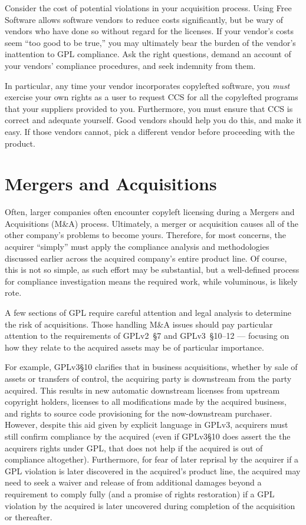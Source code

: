 Consider the cost of potential violations in your acquisition process.
Using Free Software allows software vendors to reduce costs significantly, but be
wary of vendors who have done so without regard for the licenses.  If your
vendor's costs seem ``too good to be true,'' you may ultimately bear the
burden of the vendor's inattention to GPL compliance.  Ask the right
questions, demand an account of your vendors' compliance procedures, and
seek indemnity from them.

In particular, any time your vendor incorporates copylefted software, you
\textit{must} exercise your own rights as a user to request CCS for all the
copylefted programs that your suppliers provided to you.  Furthermore, you
must ensure that CCS is correct and adequate yourself.  Good vendors should
help you do this, and make it easy.  If those vendors cannot, pick a
different vendor before proceeding with the product. 

\section{Mergers and Acquisitions}

Often, larger companies often encounter copyleft licensing during a Mergers
and Acquisitions (M\&A) process.  Ultimately, a merger or acquisition causes
all of the other company's problems to become yours.  Therefore, for most
concerns, the acquirer ``simply'' must apply the compliance analysis and
methodologies discussed earlier across the acquired company's entire product
line.  Of course, this is not so simple, as such effort may be substantial,
but a well-defined process for compliance investigation means the required
work, while voluminous, is likely rote.

A few sections of GPL require careful attention and legal analysis to
determine the risk of acquisitions.  Those handling M\&A issues should pay
particular attention to the requirements of GPLv2~\S7 and GPLv3~\S10--12 ---
focusing on how they relate to the acquired assets may be of particular
importance.

For example, GPLv3\S10 clarifies that in business acquisitions, whether by
sale of assets or transfers of control, the acquiring party is downstream
from the party acquired.  This results in new automatic downstream licenses
from upstream copyright holders, licenses to all modifications made by the
acquired business, and rights to source code provisioning for the
now-downstream purchaser.  However, despite this aid given by explicit
language in GPLv3, acquirers must still confirm compliance by the acquired
(even if GPLv3\S10 does assert the the acquirers rights under GPL, that does
not help if the acquired is out of compliance altogether).  Furthermore, for
fear of later reprisal by the acquirer if a GPL violation is later discovered
in the acquired's product line, the acquired may need to seek a waiver and
release of from additional damages beyond a requirement to comply fully (and
a promise of rights restoration) if a GPL violation by the acquired is later
uncovered during completion of the acquisition or thereafter.

